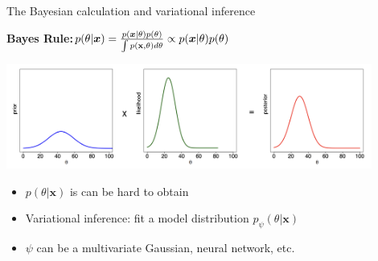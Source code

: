 \documentclass{beamer}					%
\begin{document}
\begin{frame}{The Bayesian calculation and variational inference}


\textbf{Bayes Rule:}\;\;$p(\theta\lvert \boldsymbol{x}) = \frac{p(\boldsymbol{x}\lvert \theta)p(\theta)}{\int p(\bold{x},\theta)d\theta} \propto p(\boldsymbol{x}\lvert \theta)p(\theta)$
\vspace{0.75cm}

\includegraphics[width=12cm]{../../dissertation/dissertation/media/BayesRule.png}
\vspace{0.5cm}

\begin{itemize}
\item $p(\theta\lvert \boldsymbol{x})$ is can be hard to obtain
\item Variational inference: fit a model distribution $p_{\psi}(\theta\lvert \boldsymbol{x})$
\item $\psi$ can be a multivariate Gaussian, neural network, etc.
\end{itemize}

\end{frame}
\end{document}
